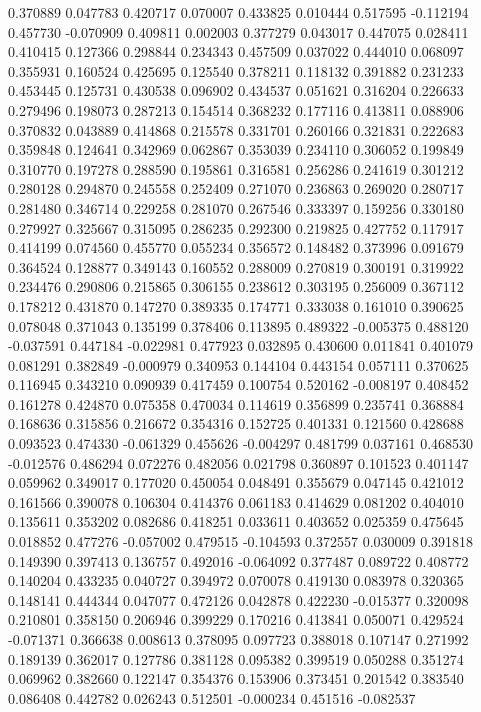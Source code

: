 0.370889
0.047783
0.420717
0.070007
0.433825
0.010444
0.517595
-0.112194
0.457730
-0.070909
0.409811
0.002003
0.377279
0.043017
0.447075
0.028411
0.410415
0.127366
0.298844
0.234343
0.457509
0.037022
0.444010
0.068097
0.355931
0.160524
0.425695
0.125540
0.378211
0.118132
0.391882
0.231233
0.453445
0.125731
0.430538
0.096902
0.434537
0.051621
0.316204
0.226633
0.279496
0.198073
0.287213
0.154514
0.368232
0.177116
0.413811
0.088906
0.370832
0.043889
0.414868
0.215578
0.331701
0.260166
0.321831
0.222683
0.359848
0.124641
0.342969
0.062867
0.353039
0.234110
0.306052
0.199849
0.310770
0.197278
0.288590
0.195861
0.316581
0.256286
0.241619
0.301212
0.280128
0.294870
0.245558
0.252409
0.271070
0.236863
0.269020
0.280717
0.281480
0.346714
0.229258
0.281070
0.267546
0.333397
0.159256
0.330180
0.279927
0.325667
0.315095
0.286235
0.292300
0.219825
0.427752
0.117917
0.414199
0.074560
0.455770
0.055234
0.356572
0.148482
0.373996
0.091679
0.364524
0.128877
0.349143
0.160552
0.288009
0.270819
0.300191
0.319922
0.234476
0.290806
0.215865
0.306155
0.238612
0.303195
0.256009
0.367112
0.178212
0.431870
0.147270
0.389335
0.174771
0.333038
0.161010
0.390625
0.078048
0.371043
0.135199
0.378406
0.113895
0.489322
-0.005375
0.488120
-0.037591
0.447184
-0.022981
0.477923
0.032895
0.430600
0.011841
0.401079
0.081291
0.382849
-0.000979
0.340953
0.144104
0.443154
0.057111
0.370625
0.116945
0.343210
0.090939
0.417459
0.100754
0.520162
-0.008197
0.408452
0.161278
0.424870
0.075358
0.470034
0.114619
0.356899
0.235741
0.368884
0.168636
0.315856
0.216672
0.354316
0.152725
0.401331
0.121560
0.428688
0.093523
0.474330
-0.061329
0.455626
-0.004297
0.481799
0.037161
0.468530
-0.012576
0.486294
0.072276
0.482056
0.021798
0.360897
0.101523
0.401147
0.059962
0.349017
0.177020
0.450054
0.048491
0.355679
0.047145
0.421012
0.161566
0.390078
0.106304
0.414376
0.061183
0.414629
0.081202
0.404010
0.135611
0.353202
0.082686
0.418251
0.033611
0.403652
0.025359
0.475645
0.018852
0.477276
-0.057002
0.479515
-0.104593
0.372557
0.030009
0.391818
0.149390
0.397413
0.136757
0.492016
-0.064092
0.377487
0.089722
0.408772
0.140204
0.433235
0.040727
0.394972
0.070078
0.419130
0.083978
0.320365
0.148141
0.444344
0.047077
0.472126
0.042878
0.422230
-0.015377
0.320098
0.210801
0.358150
0.206946
0.399229
0.170216
0.413841
0.050071
0.429524
-0.071371
0.366638
0.008613
0.378095
0.097723
0.388018
0.107147
0.271992
0.189139
0.362017
0.127786
0.381128
0.095382
0.399519
0.050288
0.351274
0.069962
0.382660
0.122147
0.354376
0.153906
0.373451
0.201542
0.383540
0.086408
0.442782
0.026243
0.512501
-0.000234
0.451516
-0.082537

